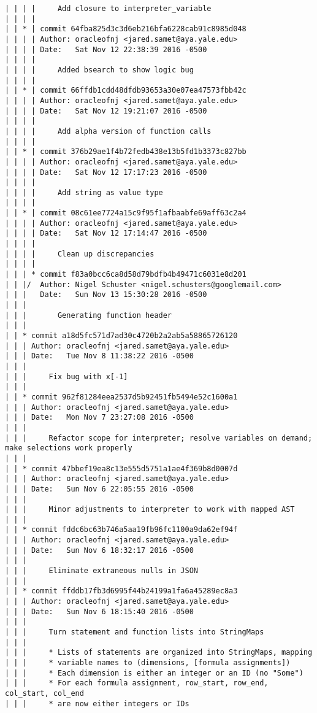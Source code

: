 \begin{lstlisting}
| | | |     Add closure to interpreter_variable
| | | |     
| | * | commit 64fba825d3c3d6eb216bfa6228cab91c8985d048
| | | | Author: oracleofnj <jared.samet@aya.yale.edu>
| | | | Date:   Sat Nov 12 22:38:39 2016 -0500
| | | | 
| | | |     Added bsearch to show logic bug
| | | |     
| | * | commit 66ffdb1cdd48dfdb93653a30e07ea47573fbb42c
| | | | Author: oracleofnj <jared.samet@aya.yale.edu>
| | | | Date:   Sat Nov 12 19:21:07 2016 -0500
| | | | 
| | | |     Add alpha version of function calls
| | | |     
| | * | commit 376b29ae1f4b72fedb438e13b5fd1b3373c827bb
| | | | Author: oracleofnj <jared.samet@aya.yale.edu>
| | | | Date:   Sat Nov 12 17:17:23 2016 -0500
| | | | 
| | | |     Add string as value type
| | | |     
| | * | commit 08c61ee7724a15c9f95f1afbaabfe69aff63c2a4
| | | | Author: oracleofnj <jared.samet@aya.yale.edu>
| | | | Date:   Sat Nov 12 17:14:47 2016 -0500
| | | | 
| | | |     Clean up discrepancies
| | | |     
| | | * commit f83a0bcc6ca8d58d79bdfb4b49471c6031e8d201
| | |/  Author: Nigel Schuster <nigel.schusters@googlemail.com>
| | |   Date:   Sun Nov 13 15:30:28 2016 -0500
| | |   
| | |       Generating function header
| | |    
| | * commit a18d5fc571d7ad30c4720b2a2ab5a58865726120
| | | Author: oracleofnj <jared.samet@aya.yale.edu>
| | | Date:   Tue Nov 8 11:38:22 2016 -0500
| | | 
| | |     Fix bug with x[-1]
| | |    
| | * commit 962f81284eea2537d5b92451fb5494e52c1600a1
| | | Author: oracleofnj <jared.samet@aya.yale.edu>
| | | Date:   Mon Nov 7 23:27:08 2016 -0500
| | | 
| | |     Refactor scope for interpreter; resolve variables on demand; make selections work properly
| | |    
| | * commit 47bbef19ea8c13e555d5751a1ae4f369b8d0007d
| | | Author: oracleofnj <jared.samet@aya.yale.edu>
| | | Date:   Sun Nov 6 22:05:55 2016 -0500
| | | 
| | |     Minor adjustments to interpreter to work with mapped AST
| | |    
| | * commit fddc6bc63b746a5aa19fb96fc1100a9da62ef94f
| | | Author: oracleofnj <jared.samet@aya.yale.edu>
| | | Date:   Sun Nov 6 18:32:17 2016 -0500
| | | 
| | |     Eliminate extraneous nulls in JSON
| | |    
| | * commit ffddb17fb3d6995f44b24199a1fa6a45289ec8a3
| | | Author: oracleofnj <jared.samet@aya.yale.edu>
| | | Date:   Sun Nov 6 18:15:40 2016 -0500
| | | 
| | |     Turn statement and function lists into StringMaps
| | |     
| | |     * Lists of statements are organized into StringMaps, mapping
| | |     * variable names to (dimensions, [formula assignments])
| | |     * Each dimension is either an integer or an ID (no "Some")
| | |     * For each formula assignment, row_start, row_end, col_start, col_end
| | |     * are now either integers or IDs

\end{lstlisting}
